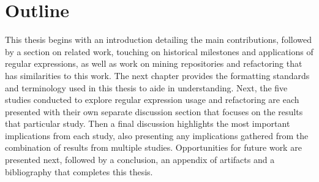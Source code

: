 \section{Outline}

This thesis begins with an introduction detailing the main contributions, followed by a section on related work, touching on historical milestones and applications of regular expressions, as well as work on mining repositories and refactoring that has similarities to this work. The next chapter provides the formatting standards and terminology used in this thesis to aide in understanding.  Next, the five studies conducted to explore regular expression usage and refactoring are each presented with their own separate discussion section that focuses on the results that particular study.  Then a final discussion highlights the most important implications from each study, also presenting any implications gathered from the combination of results from multiple studies. Opportunities for future work are presented next, followed by a conclusion, an appendix of artifacts and a bibliography that completes this thesis.
